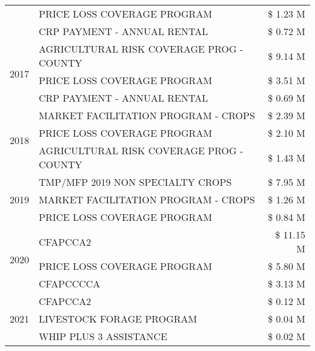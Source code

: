\begin{tabular}{llr}
 & PRICE LOSS COVERAGE PROGRAM & \$ 1.23 M \\
 & CRP PAYMENT - ANNUAL RENTAL & \$ 0.72 M \\
\cline{1-3}
\multirow[t]{3}{*}{2017} & AGRICULTURAL RISK COVERAGE PROG - COUNTY & \$ 9.14 M \\
 & PRICE LOSS COVERAGE PROGRAM & \$ 3.51 M \\
 & CRP PAYMENT - ANNUAL RENTAL & \$ 0.69 M \\
\cline{1-3}
\multirow[t]{3}{*}{2018} & MARKET FACILITATION PROGRAM - CROPS & \$ 2.39 M \\
 & PRICE LOSS COVERAGE PROGRAM & \$ 2.10 M \\
 & AGRICULTURAL RISK COVERAGE PROG - COUNTY & \$ 1.43 M \\
\cline{1-3}
\multirow[t]{3}{*}{2019} & TMP/MFP 2019 NON SPECIALTY CROPS & \$ 7.95 M \\
 & MARKET FACILITATION PROGRAM - CROPS & \$ 1.26 M \\
 & PRICE LOSS COVERAGE PROGRAM & \$ 0.84 M \\
\cline{1-3}
\multirow[t]{3}{*}{2020} & CFAPCCA2 & \$ 11.15 M \\
 & PRICE LOSS COVERAGE PROGRAM & \$ 5.80 M \\
 & CFAPCCCCA & \$ 3.13 M \\
\cline{1-3}
\multirow[t]{3}{*}{2021} & CFAPCCA2 & \$ 0.12 M \\
 & LIVESTOCK FORAGE PROGRAM & \$ 0.04 M \\
 & WHIP PLUS 3 ASSISTANCE & \$ 0.02 M \\
\cline{1-3}
\bottomrule
\end{tabular}
